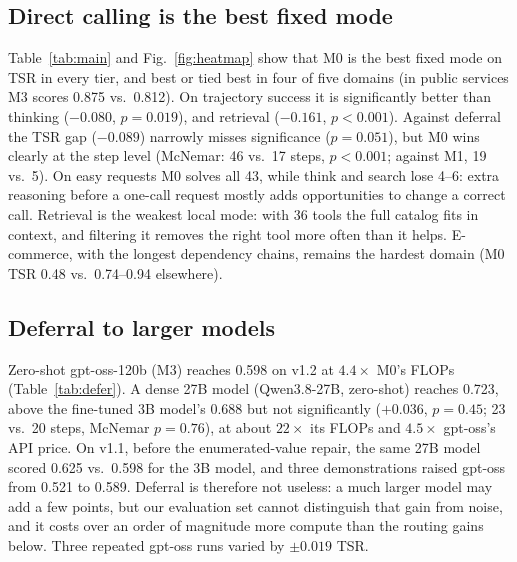 \documentclass[conference,a4paper]{IEEEtran}
\newcommand{\QwenVtwo}{0.723} %
\begin{document}
\subsection{Direct calling is the best fixed mode}
Table~\ref{tab:main} and Fig.~\ref{fig:heatmap} show that M0 is the best fixed
mode on TSR in every tier, and best or tied best in four of five domains (in
public services M3 scores 0.875 vs.\ 0.812). On trajectory
success it is significantly better than thinking ($-0.080$, $p=0.019$),
and retrieval ($-0.161$, $p<0.001$). Against deferral the TSR gap ($-0.089$)
narrowly misses significance ($p=0.051$), but M0 wins clearly at the step
level (McNemar: 46 vs.\ 17 steps, $p<0.001$; against M1, 19 vs.\ 5). On easy requests M0 solves all 43, while think and search lose 4--6:
extra reasoning before a one-call request mostly adds opportunities to change a
correct call. Retrieval is the weakest local mode: with 36 tools the full
catalog fits in context, and filtering it removes the right tool more often
than it helps. E-commerce, with the longest dependency chains, remains the
hardest domain (M0 TSR 0.48 vs.\ 0.74--0.94 elsewhere).

\subsection{Deferral to larger models}
\label{sec:defer}
Zero-shot gpt-oss-120b (M3) reaches 0.598 on v1.2 at $4.4\times$ M0's FLOPs
(Table~\ref{tab:defer}). A dense 27B model (Qwen3.8-27B, zero-shot) reaches
\QwenVtwo, above the fine-tuned 3B model's 0.688 but not significantly
($+0.036$, $p=0.45$; 23 vs.\ 20 steps, McNemar $p=0.76$), at about $22\times$ its FLOPs
and $4.5\times$ gpt-oss's API price. On v1.1, before the enumerated-value
repair, the same 27B model scored 0.625 vs.\ 0.598 for the 3B model, and three
demonstrations raised gpt-oss from 0.521 to 0.589. Deferral is therefore not
useless: a much larger model may add a few points, but our evaluation set
cannot distinguish that gain from noise, and it costs over an order of
magnitude more compute than the routing gains below. Three repeated gpt-oss
runs varied by $\pm0.019$ TSR.
\end{document}
